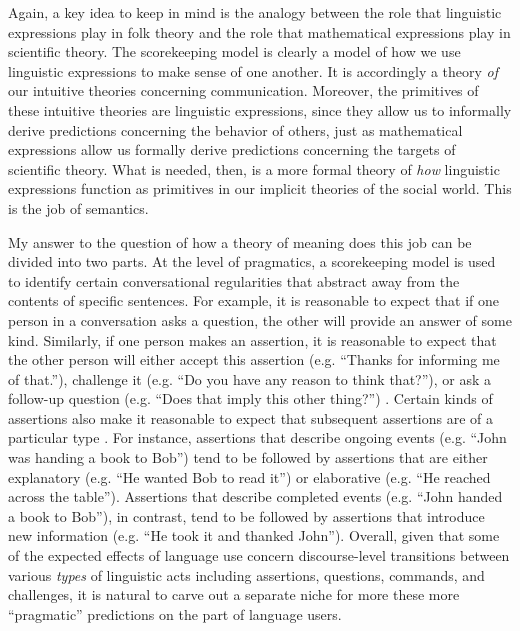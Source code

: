 Again, a key idea to keep in mind is the analogy between the role that linguistic expressions play in folk theory and the role that mathematical expressions play in scientific theory. The scorekeeping model is clearly a model of how we use linguistic expressions to make sense of one another. It is accordingly a theory \textit{of} our intuitive theories concerning communication. Moreover, the primitives of these intuitive theories are linguistic expressions, since they allow us to informally derive predictions concerning the behavior of others, just as mathematical expressions allow us formally derive predictions concerning the targets of scientific theory. What is needed, then, is a more formal theory of \textit{how} linguistic expressions function as primitives in our implicit theories of the social world. This is the job of semantics.

My answer to the question of how a theory of meaning does this job can be divided into two parts. At the level of pragmatics, a scorekeeping model is used to identify certain conversational regularities that abstract away from the contents of specific sentences. For example, it is reasonable to expect that if one person in a conversation asks a question, the other will provide an answer of some kind. Similarly, if one person makes an assertion, it is reasonable to expect that the other person will either accept this assertion (e.g. ``Thanks for informing me of that.''), challenge it (e.g. ``Do you have any reason to think that?''), or ask a follow-up question (e.g. ``Does that imply this other thing?'') \citep[][Ch. 3]{Brandom:1994}. Certain kinds of assertions also make it reasonable to expect that subsequent assertions are of a particular type \citep{Rohde:2008}. For instance, assertions that describe ongoing events (e.g. ``John was handing a book to Bob'') tend to be followed by assertions that are either explanatory (e.g. ``He wanted Bob to read it'') or elaborative (e.g. ``He reached across the table''). Assertions that describe completed events (e.g. ``John handed a book to Bob''), in contrast, tend to be followed by assertions that introduce new information (e.g. ``He took it and thanked John''). Overall, given that some of the expected effects of language use concern discourse-level transitions between various \textit{types} of linguistic acts including assertions, questions, commands, and challenges, it is natural to carve out a separate niche for more these more ``pragmatic'' predictions on the part of language users. 


